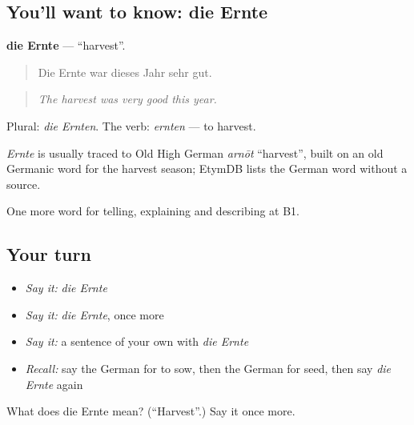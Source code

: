 \subsection*{You'll want to know: die Ernte}
\textbf{die Ernte} — \textquotedblleft{}harvest\textquotedblright{}.

\begin{quote}
Die Ernte war dieses Jahr sehr gut.
\end{quote}

\begin{quote}
\emph{The harvest was very good this year.}
\end{quote}

Plural: \emph{die Ernten}. The verb: \emph{ernten} — to harvest.

\begin{cousinweb}
\emph{Ernte} is usually traced to Old High German \emph{arnōt} \textquotedblleft{}harvest\textquotedblright{}, built on an old Germanic word for the harvest season; EtymDB lists the German word without a source.
\end{cousinweb}

\begin{grammarlens}[title={What you've built}]
One more word for telling, explaining and describing at B1.
\end{grammarlens}

\subsection*{Your turn}
\begin{itemize}
\raggedright
  \item \emph{Say it:} \emph{die Ernte}
  \item \emph{Say it:} \emph{die Ernte}, once more
  \item \emph{Say it:} a sentence of your own with \emph{die Ernte}
  \item \emph{Recall:} say the German for to sow, then the German for seed, then say \emph{die Ernte} again
\end{itemize}

\begin{tcolorbox}[breakable,colback=teal!4,colframe=teal!35!black,title={Before you move on}]
What does die Ernte mean? (\textquotedblleft{}Harvest\textquotedblright{}.) Say it once more.
\end{tcolorbox}
